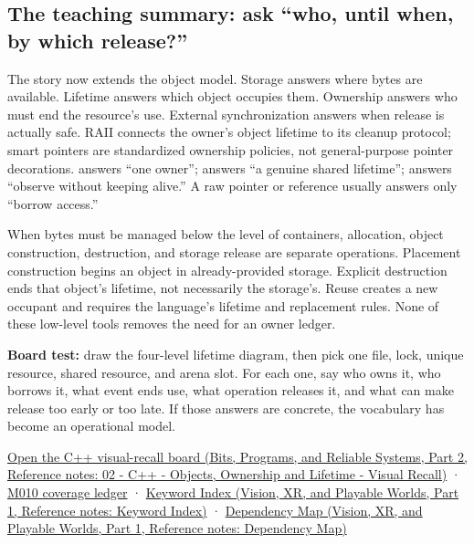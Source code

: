 \subsection{The teaching summary: ask ``who, until when, by which release?''}\label{01-foundations-i-ch004-the-teaching-summary-ask-who-until-when-by-which-release}

\hypertarget{01-foundations-i-ch004-the-teaching-summary-ask-who-until-when-by-which-release}{}

The story now extends the object model. Storage answers where bytes are available. Lifetime answers which object occupies them. Ownership answers who must end the resource's use. External synchronization answers when release is actually safe. RAII connects the owner's object lifetime to its cleanup protocol; smart pointers are standardized ownership policies, not general-purpose pointer decorations.  answers ``one owner'';  answers ``a genuine shared lifetime'';  answers ``observe without keeping alive.'' A raw pointer or reference usually answers only ``borrow access.''

When bytes must be managed below the level of containers, allocation, object construction, destruction, and storage release are separate operations. Placement construction begins an object in already-provided storage. Explicit destruction ends that object's lifetime, not necessarily the storage's. Reuse creates a new occupant and requires the language's lifetime and replacement rules. None of these low-level tools removes the need for an owner ledger.

\textbf{Board test:} draw the four-level lifetime diagram, then pick one file, lock, unique resource, shared resource, and arena slot. For each one, say who owns it, who borrows it, what event ends use, what operation releases it, and what can make release too early or too late. If those answers are concrete, the vocabulary has become an operational model.

\href{../01-Bits-Programs-and-Reliable-Systems-P02/main.pdf\#nameddest=appendix-960160274237}{Open the C++ visual-recall board (Bits, Programs, and Reliable Systems, Part 2, Reference notes: 02 - C++ - Objects, Ownership and Lifetime - Visual Recall)} · \hyperref[appendix-fd090d982a15-m010---parts-148-160]{M010 coverage ledger} · \href{../07-Vision-XR-and-Playable-Worlds-P01/main.pdf\#nameddest=appendix-a6d556a4ef50}{Keyword Index (Vision, XR, and Playable Worlds, Part 1, Reference notes: Keyword Index)} · \href{../07-Vision-XR-and-Playable-Worlds-P01/main.pdf\#nameddest=appendix-4ad47bdd269a}{Dependency Map (Vision, XR, and Playable Worlds, Part 1, Reference notes: Dependency Map)}

